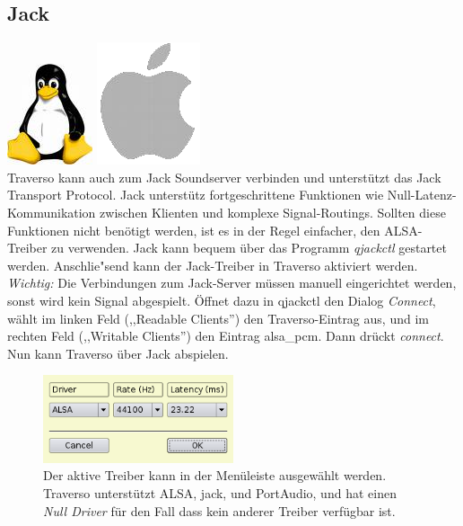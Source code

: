 \subsection{Jack}
\includegraphics[height=\baselineskip]{images/tux.png}
\includegraphics[height=\baselineskip]{images/mac.png}
\\
Traverso kann auch zum Jack Soundserver verbinden und unterstützt das Jack Transport Protocol. Jack unterstütz fortgeschrittene Funktionen wie Null-Latenz-Kommunikation zwischen Klienten und komplexe Signal-Routings. Sollten diese Funktionen nicht benötigt werden, ist es in der Regel einfacher, den ALSA-Treiber zu verwenden. Jack kann bequem über das Programm \emph{qjackctl} gestartet werden. Anschlie"send kann der Jack-Treiber in Traverso aktiviert werden. \emph{Wichtig:} Die Verbindungen zum Jack-Server müssen manuell eingerichtet werden, sonst wird kein Signal abgespielt. Öffnet dazu in qjackctl den Dialog \emph{Connect}, wählt im linken Feld (,,Readable Clients'') den Traverso-Eintrag aus, und im rechten Feld (,,Writable Clients'') den Eintrag alsa\_pcm. Dann drückt \emph{connect}. Nun kann Traverso über Jack abspielen.

\begin{figure}
 \centering\includegraphics[width=0.5\textwidth]{images/sshot02.png}
 \caption{Der aktive Treiber kann in der Menüleiste ausgewählt werden. Traverso unterstützt ALSA, jack, und PortAudio, und hat einen \emph{Null Driver} für den Fall dass kein anderer Treiber verfügbar ist.}
 \label{fig_driverconf}
\end{figure}

